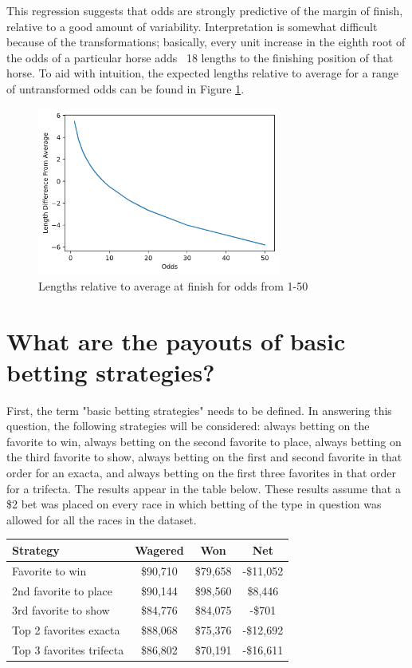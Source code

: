 \documentclass{article}
\begin{document}
\noindent This regression suggests that odds are strongly predictive of the margin of finish, relative to a good amount of variability. Interpretation is somewhat difficult because of the transformations; basically, every unit increase in the eighth root of the odds of a particular horse adds ~18 lengths to the finishing position of that horse. To aid with intuition, the expected lengths relative to average for a range of untransformed odds can be found in Figure \ref{figure:oddsLengthsRegActual}. 

\begin{figure}
    \centering
    \includegraphics[width=8cm]{images/odds_lengths_actual_reg_chart.png}

    \caption{Lengths relative to average at finish for odds from 1-50} 
    \label{figure:oddsLengthsRegActual}   
\end{figure}

\section*{What are the payouts of basic betting strategies?}

First, the term "basic betting strategies" needs to be defined. In answering this question, the following strategies will be considered: always betting on the favorite to win, always betting on the second favorite to place, always betting on the third favorite to show, always betting on the first and second favorite in that order for an exacta, and always betting on the first three favorites in that order for a trifecta. The results appear in the table below. These results assume that a \$2 bet was placed on every race in which betting of the type in question was allowed for all the races in the dataset.

\begin{center}
    \begin{tabular}{ |l|c|c|c| } 
     \hline
     \textbf{Strategy} & \textbf{Wagered} & \textbf{Won} & \textbf{Net} \\
     \hline
     Favorite to win & \$90,710 & \$79,658 & -\$11,052 \\ 
     \hline
     2nd favorite to place & \$90,144 & \$98,560 & \$8,446 \\ 
     \hline
     3rd favorite to show & \$84,776 & \$84,075 & -\$701 \\ 
     \hline
     Top 2 favorites exacta & \$88,068 & \$75,376 & -\$12,692 \\ 
     \hline
     Top 3 favorites trifecta & \$86,802 & \$70,191 & -\$16,611 \\
     \hline
    \end{tabular}
\end{center}
\end{document}
